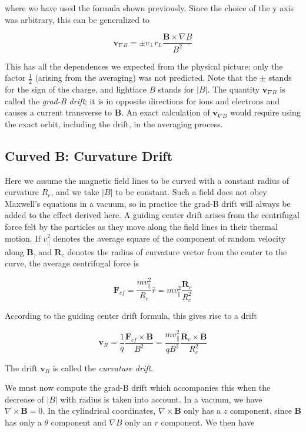 \documentclass[
  notoc %
]{tufte-book}
\begin{document}
where we have used the formula shown previously. Since the choice of the
y axis was arbitrary, this can be generalized to

\[
\mathbf{v}_{\nabla B} = \pm v_\perp r_L \frac{\mathbf{B}\times \nabla B}{B^2}
\]

This has all the dependences we expected from the physical picture; only
the factor \(\frac{1}{2}\) (arising from the averaging) was not
predicted. Note that the \(\pm\) stands for the sign of the charge, and
lightface \(B\) stands for \(|B|\). The quantity
\(\mathbf{v}_{\nabla B}\) is called the \emph{grad-B drift}; it is in
opposite directions for ions and electrons and causes a current
transverse to \(\mathbf{B}\). An exact calculation of
\(\mathbf{v}_{\nabla B}\) would require using the exact orbit, including
the drift, in the averaging process.

\hypertarget{curved-b-curvature-drift}{%
\subsection{Curved B: Curvature Drift}\label{curved-b-curvature-drift}}

Here we assume the magnetic field lines to be curved with a constant
radius of curvature \(R_c\), and we take \(|B|\) to be constant. Such a
field does not obey Maxwell's equations in a vacuum, so in practice the
grad-B drift will always be added to the effect derived here. A guiding
center drift arises from the centrifugal force felt by the particles as
they move along the field lines in their thermal motion. If
\(v_\parallel^2\) denotes the average square of the component of random
velocity along \(\mathbf{B}\), and \(\mathbf{R}_c\) denotes the radius
of curvature vector from the center to the curve, the average
centrifugal force is

\[
\mathbf{F}_{cf} = \frac{mv_\parallel^2}{R_c}\widehat{r} = mv_\parallel^2\frac{\mathbf{R}_c}{R_c^2}
\]

According to the guiding center drift formula, this gives rise to a
drift

\[
\mathbf{v}_{R} = \frac{1}{q}\frac{\mathbf{F}_{cf}\times\mathbf{B}}{B^2} = \frac{mv_\parallel^2}{qB^2}\frac{\mathbf{R}_c \times\mathbf{B}}{R_c^2}
\]

The drift \(\mathbf{v}_R\) is called the \emph{curvature drift}.

We must now compute the grad-B drift which accompanies this when the
decrease of \(|B|\) with radius is taken into account. In a vacuum, we
have \(\nabla\times\mathbf{B} = 0\). In the cylindrical coordinates,
\(\nabla\times\mathbf{B}\) only has a \(z\) component, since
\(\mathbf{B}\) has only a \(\theta\) component and \(\nabla B\) only an
\(r\) component. We then have
\end{document}
